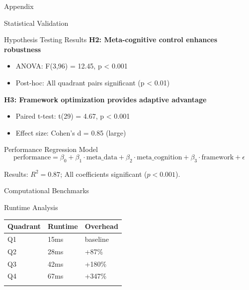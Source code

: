 \documentclass[
  ignorenonframetext,
]{beamer}
\newcounter{none} %
\providecommand{\tightlist}{%
  \setlength{\itemsep}{0pt}\setlength{\parskip}{0pt}}
\begin{document}
\begin{frame}[fragile]{Appendix}
\begin{block}{Statistical Validation}
\begin{block}{Hypothesis Testing Results}
\textbf{H2: Meta-cognitive control enhances robustness}

\begin{itemize}
\tightlist
\item
  ANOVA: F(3,96) = 12.45, p \textless{} 0.001
\item
  Post-hoc: All quadrant pairs significant (p \textless{} 0.01)
\end{itemize}

\textbf{H3: Framework optimization provides adaptive advantage}

\begin{itemize}
\tightlist
\item
  Paired t-test: t(29) = 4.67, p \textless{} 0.001
\item
  Effect size: Cohen's d = 0.85 (large)
\end{itemize}
\end{block}

\begin{block}{Performance Regression Model}
\protect{}\label{performance-regression-model}
\begin{equation}
\text{performance} = \beta_0 + \beta_1 \cdot \text{meta\_data} + \beta_2 \cdot \text{meta\_cognition} + \beta_3 \cdot \text{framework} + \epsilon
\label{eq:performance_regression}
\end{equation}

Results: \(R^2 = 0.87\); All coefficients significant (\(p < 0.001\)).
\end{block}
\end{block}

\begin{block}{Computational Benchmarks}
\protect{}\label{sec:computational_benchmarks}
\begin{block}{Runtime Analysis}
\protect{}\label{runtime-analysis}
{\def\LTcaptype{none} %
\begin{longtable}[]{@{}lll@{}}
\toprule\noalign{}
Quadrant & Runtime & Overhead \\
\midrule\noalign{}
\endhead
Q1 & 15ms & baseline \\
Q2 & 28ms & +87\% \\
Q3 & 42ms & +180\% \\
Q4 & 67ms & +347\% \\
\bottomrule\noalign{}
\end{longtable}
}
\end{block}


\end{block}
\end{frame}
\end{document}
